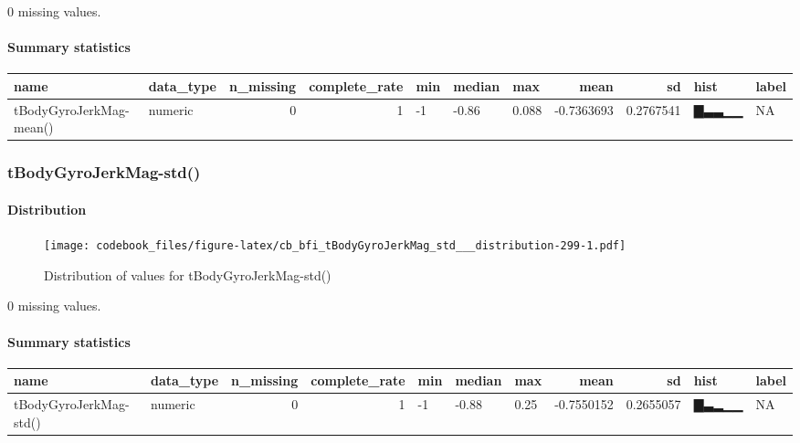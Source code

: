 \documentclass[
]{article}
\begin{document}
0 missing values.

\hypertarget{tBodyGyroJerkMag_mean___summary}{%
\paragraph{Summary statistics}\label{tBodyGyroJerkMag_mean___summary}}

\begin{longtable}[]{@{}llrrlllrrll@{}}
\toprule
name & data\_type & n\_missing & complete\_rate & min & median & max &
mean & sd & hist & label \\
\midrule
\endhead
tBodyGyroJerkMag-mean() & numeric & 0 & 1 & -1 & -0.86 & 0.088 &
-0.7363693 & 0.2767541 & ▇▃▃▁▁ & NA \\
\bottomrule
\end{longtable}

\hypertarget{tBodyGyroJerkMag_std__}{%
\subsubsection{tBodyGyroJerkMag-std()}\label{tBodyGyroJerkMag_std__}}

\hypertarget{tBodyGyroJerkMag_std___distribution}{%
\paragraph{Distribution}\label{tBodyGyroJerkMag_std___distribution}}

\begin{figure}
\centering
\texttt{[image: codebook\_files/figure-latex/cb\_bfi\_tBodyGyroJerkMag\_std\_\_\_distribution-299-1.pdf]}
\caption{Distribution of values for tBodyGyroJerkMag-std()}
\end{figure}

0 missing values.

\hypertarget{tBodyGyroJerkMag_std___summary}{%
\paragraph{Summary statistics}\label{tBodyGyroJerkMag_std___summary}}

\begin{longtable}[]{@{}llrrlllrrll@{}}
\toprule
name & data\_type & n\_missing & complete\_rate & min & median & max &
mean & sd & hist & label \\
\midrule
\endhead
tBodyGyroJerkMag-std() & numeric & 0 & 1 & -1 & -0.88 & 0.25 &
-0.7550152 & 0.2655057 & ▇▃▂▁▁ & NA \\
\bottomrule
\end{longtable}
\end{document}
